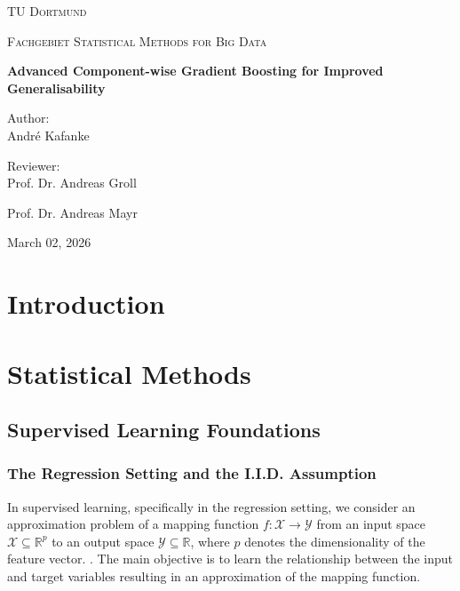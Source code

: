 \documentclass[fontsize=12 pt]{scrartcl}
\begin{document}
\begin{titlepage}
    \centering
    {\scshape\LARGE TU Dortmund \par}
    \vspace{1cm}
    {\scshape\Large Fachgebiet Statistical Methods for Big Data \par}
    \vspace{1cm}
    {\huge\bfseries Advanced Component-wise Gradient Boosting for Improved Generalisability\par}
        {\Large \par}
    \vspace{2cm}
    {\Large Author:\\
            André Kafanke \par}
    \vspace{3cm}
        {\Large Reviewer:\\
        Prof. Dr. Andreas Groll\\\par}    
        {\Large Prof. Dr. Andreas Mayr\\\par}    
    \vfill
    {\large March 02, 2026\par}
\end{titlepage}

\tableofcontents
\newpage
\listoffigures
\cleardoublepage


\section{Introduction}

\newpage
\section{Statistical Methods}

\subsection{Supervised Learning Foundations}
\subsubsection{The Regression Setting and the I.I.D. Assumption}

In supervised learning, specifically in the regression setting, we consider an approximation problem of a mapping function $f: \mathcal{X} \rightarrow \mathcal{Y}$ from an input space $\mathcal{X} \subseteq \mathbb{R}^p$ to an output space $\mathcal{Y} \subseteq \mathbb{R}$, where $p$ denotes the dimensionality of the feature vector. \citep{hastie2009elements}. The main objective is to learn the relationship between the input and target variables resulting in an approximation of the mapping function. 
\end{document}
